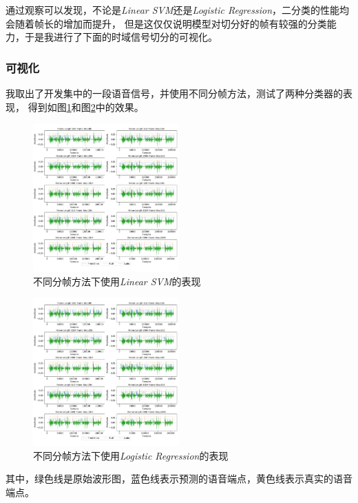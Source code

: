 \documentclass[a4paper]{article}
\begin{document}
通过观察可以发现，不论是\emph{Linear SVM}还是\emph{Logistic Regression}，二分类的性能均会随着帧长的增加而提升，
但是这仅仅说明模型对切分好的帧有较强的分类能力，于是我进行了下面的时域信号切分的可视化。

\subsubsection{可视化}
我取出了开发集中的一段语音信号，并使用不同分帧方法，测试了两种分类器的表现，
得到如图\ref{fig:results Linear SVM}和图\ref{fig:results Logistic Regression}中的效果。
\begin{figure}[H]
  \centering
  \includegraphics[width=0.5\textwidth]{figs/visualize_results_Linear_SVM.pdf}
  \caption{不同分帧方法下使用\emph{Linear SVM}的表现}
  \label{fig:results Linear SVM}
\end{figure}

\begin{figure}[ht]
  \centering
  \includegraphics[width=0.5\textwidth]{figs/visualize_results_Logistic_Regression.pdf}
  \caption{不同分帧方法下使用\emph{Logistic Regression}的表现}
  \label{fig:results Logistic Regression}
\end{figure}
其中，绿色线是原始波形图，蓝色线表示预测的语音端点，黄色线表示真实的语音端点。
\end{document}
